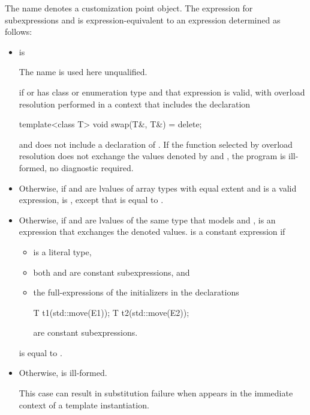 \pnum
{}%
The name  denotes a customization point
object. The expression
 for subexpressions 
and  is expression-equivalent to an expression
 determined as follows:
\begin{itemize}
\item
   is 
\begin{footnote}
The name  is used
  here unqualified.
\end{footnote}
if  or 
  has class or enumeration type and that expression is valid, with
  overload resolution performed in a context that includes the declaration
\begin{codeblock}
template<class T>
  void swap(T&, T&) = delete;
\end{codeblock}
  and does not include a declaration of .
  If the function selected by overload resolution does not
  exchange the values denoted by
   and ,
  the program is ill-formed, no diagnostic required.

\item
  Otherwise, if  and 
  are lvalues of array types
  with equal extent and 
  is a valid expression,
   is ,
  except that
   is equal to
  .

\item
  Otherwise, if  and  are lvalues of the
  same type  that models  and
  ,
   is an expression that exchanges the denoted values.
   is a constant expression if
  \begin{itemize}
  \item {} is a literal type,
  \item both  and  are
    constant subexpressions, and
  \item the full-expressions of the initializers in the declarations
\begin{codeblock}
T t1(std::move(E1));
T t2(std::move(E2));
\end{codeblock}
are constant subexpressions.
  \end{itemize}
   is equal to
  .

\item
  Otherwise,  is ill-formed.
  \begin{note}
  This case can result in substitution failure when 
  appears in the immediate context of a template instantiation.
  \end{note}
\end{itemize}

